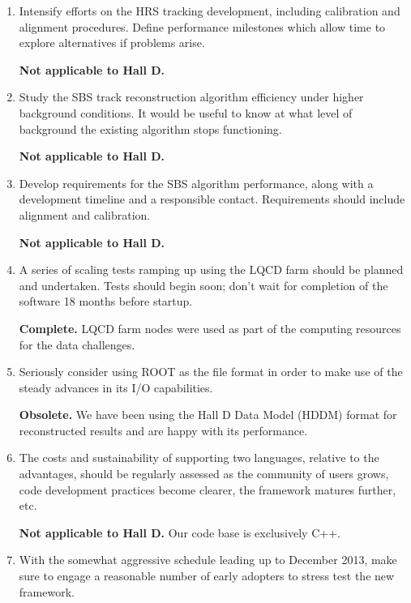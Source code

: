 \documentclass[12pt]{article}
\begin{document}
\begin{enumerate}
  {\bf Complete.} We have been using the JANA framework reconstruction
  and data analysis which is multi-threaded by design.

\item Intensify efforts on the HRS tracking development, including
  calibration and alignment procedures. Define performance milestones
  which allow time to explore alternatives if problems arise.

  {\bf Not applicable to Hall D.}

\item Study the SBS track reconstruction algorithm efficiency under
  higher background conditions. It would be useful to know at what
  level of background the existing algorithm stops functioning.

  {\bf Not applicable to Hall D.}

\item Develop requirements for the SBS algorithm performance, along
  with a development timeline and a responsible contact. Requirements
  should include alignment and calibration.

  {\bf Not applicable to Hall D.}

\item A series of scaling tests ramping up using the LQCD farm should
  be planned and undertaken. Tests should begin soon; don't wait for
  completion of the software 18 months before startup.

  {\bf Complete.} LQCD farm nodes were used as part of the computing
  resources for the data challenges.

\item Seriously consider using ROOT as the file format in order to
  make use of the steady advances in its I/O capabilities.

  {\bf Obsolete.} We have been using the Hall D Data Model (HDDM)
  format for reconstructed results and are happy with its performance.

\item The costs and sustainability of supporting two languages,
  relative to the advantages, should be regularly assessed as the
  community of users grows, code development practices become clearer,
  the framework matures further, etc.

  {\bf Not applicable to Hall D.} Our code base is exclusively C++.

\item With the somewhat aggressive schedule leading up to December
  2013, make sure to engage a reasonable number of early adopters to
  stress test the new framework.


\end{enumerate}
\end{document}
